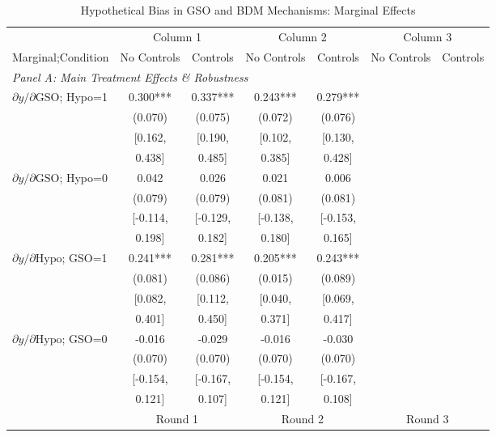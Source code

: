 \documentclass[12pt]{article}
\begin{document}
\iffalse
\begin{table}[H]
\centering
\caption{Hypothetical Bias in GSO and BDM Mechanisms: Marginal Effects}
\label{tab:All_tables}
\scriptsize
\begin{tabular}{l*{6}{c}}
\toprule
& \multicolumn{2}{c}{Column 1} & \multicolumn{2}{c}{Column 2} & \multicolumn{2}{c}{Column 3} \\
\cmidrule(lr){2-3} \cmidrule(lr){4-5} \cmidrule(lr){6-7}
Marginal;Condition & No Controls & Controls & No Controls & Controls & No Controls & Controls \\
\midrule
\multicolumn{7}{l}{\textit{Panel A: Main Treatment Effects \& Robustness}} \\
\addlinespace[1em]
$\partial y/\partial \text{GSO}$; Hypo=1 & 0.300*** & 0.337*** & 0.243*** & 0.279*** & & \\
 & (0.070) & (0.075) & (0.072) & (0.076) & & \\
 & [0.162, & [0.190, & [0.102, & [0.130, & & \\
 & 0.438] & 0.485] & 0.385] & 0.428] & & \\
\addlinespace[0.5em]
$\partial y/\partial \text{GSO}$; Hypo=0 & 0.042 & 0.026 & 0.021 & 0.006 & & \\
 & (0.079) & (0.079) & (0.081) & (0.081) & & \\
 & [-0.114, & [-0.129, & [-0.138, & [-0.153, & & \\
 & 0.198] & 0.182] & 0.180] & 0.165] & & \\
\addlinespace[0.5em]
$\partial y/\partial \text{Hypo}$; GSO=1 & 0.241*** & 0.281*** & 0.205*** & 0.243*** & & \\
 & (0.081) & (0.086) & (0.015) & (0.089) & & \\
 & [0.082, & [0.112, & [0.040, & [0.069, & & \\
 & 0.401] & 0.450] & 0.371] & 0.417] & & \\
\addlinespace[0.5em]
$\partial y/\partial \text{Hypo}$; GSO=0 & -0.016 & -0.029 & -0.016 & -0.030 & & \\
 & (0.070) & (0.070) & (0.070) & (0.070) & & \\
 & [-0.154, & [-0.167, & [-0.154, & [-0.167, & & \\
 & 0.121] & 0.107] & 0.121] & 0.108] & & \\
\addlinespace[0.5em]
\midrule
& \multicolumn{2}{c}{Round 1} & \multicolumn{2}{c}{Round 2} & \multicolumn{2}{c}{Round 3} \\
\cmidrule(lr){2-3} \cmidrule(lr){4-5} \cmidrule(lr){6-7}

\end{tabular}
\end{table}
\end{document}
